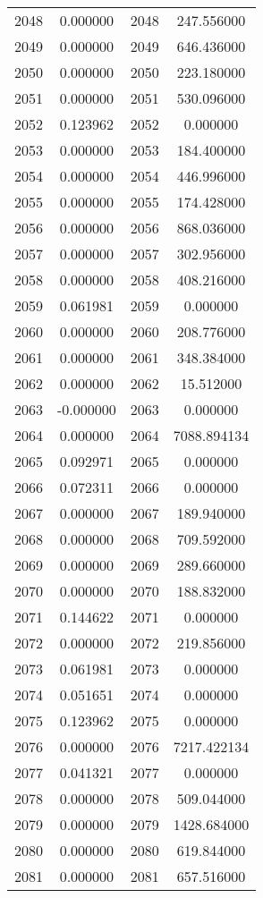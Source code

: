 \documentclass[12pt]{article}
\begin{document}
\begin{longtable}{@{}cccc@{}}
2048 & 0.000000 & 2048 & 247.556000 \\
2049 & 0.000000 & 2049 & 646.436000 \\
2050 & 0.000000 & 2050 & 223.180000 \\
2051 & 0.000000 & 2051 & 530.096000 \\
2052 & 0.123962 & 2052 & 0.000000 \\
2053 & 0.000000 & 2053 & 184.400000 \\
2054 & 0.000000 & 2054 & 446.996000 \\
2055 & 0.000000 & 2055 & 174.428000 \\
2056 & 0.000000 & 2056 & 868.036000 \\
2057 & 0.000000 & 2057 & 302.956000 \\
2058 & 0.000000 & 2058 & 408.216000 \\
2059 & 0.061981 & 2059 & 0.000000 \\
2060 & 0.000000 & 2060 & 208.776000 \\
2061 & 0.000000 & 2061 & 348.384000 \\
2062 & 0.000000 & 2062 & 15.512000 \\
2063 & -0.000000 & 2063 & 0.000000 \\
2064 & 0.000000 & 2064 & 7088.894134 \\
2065 & 0.092971 & 2065 & 0.000000 \\
2066 & 0.072311 & 2066 & 0.000000 \\
2067 & 0.000000 & 2067 & 189.940000 \\
2068 & 0.000000 & 2068 & 709.592000 \\
2069 & 0.000000 & 2069 & 289.660000 \\
2070 & 0.000000 & 2070 & 188.832000 \\
2071 & 0.144622 & 2071 & 0.000000 \\
2072 & 0.000000 & 2072 & 219.856000 \\
2073 & 0.061981 & 2073 & 0.000000 \\
2074 & 0.051651 & 2074 & 0.000000 \\
2075 & 0.123962 & 2075 & 0.000000 \\
2076 & 0.000000 & 2076 & 7217.422134 \\
2077 & 0.041321 & 2077 & 0.000000 \\
2078 & 0.000000 & 2078 & 509.044000 \\
2079 & 0.000000 & 2079 & 1428.684000 \\
2080 & 0.000000 & 2080 & 619.844000 \\
2081 & 0.000000 & 2081 & 657.516000 \\

\end{longtable}
\end{document}

